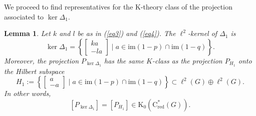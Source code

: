 \documentclass[a4paper,leqno,12pt]{article}
\numberwithin{equation}{section}
\theoremstyle{plain}
\newtheorem{lemma}[theoremcounter]{Lemma}
\theoremstyle{definition}
\theoremstyle{remark}
\newcommand{\Csr}{\mathrm{C}^*_{\text{red}}}
\begin{document}
 	We proceed to find representatives for the K-theory class of the projection associated to $\ker \Delta_1$.	  
 	
	\begin{lemma}
		\label{lem:projker}
		Let $k$ and $l$ be as in (\ref{eq3}) and (\ref{eq4}). The $\ell^2$-kernel of $\Delta_1$ is   
		\[
		\ker\Delta_1
		=
		\left\{\begin{bmatrix}ka\\ -la\end{bmatrix} \mid  a\in \mathrm{im}(1-p)\cap\mathrm{im}(1-q)\right\}.
		\] 
		Moreover, the projection $P_{\ker \Delta_1}$ has the same $K$-class as the projection $P_{H_1}$ onto the Hilbert subspace 
		\begin{equation}
			\label{eq:H1}
			H_1:=\left\{\begin{bmatrix}a\\ -a\end{bmatrix} \mid  a\in \mathrm{im}(1-p)\cap\mathrm{im}(1-q)\right\}
			\subset \ell^2(G)\oplus \ell^2(G).
		\end{equation}
		In other words,  
		\[
			[P_{\ker\Delta_1}]=[P_{H_1}]\in \mathrm K_0(\Csr(G)).
		\]
	\end{lemma}
	
\end{document}
